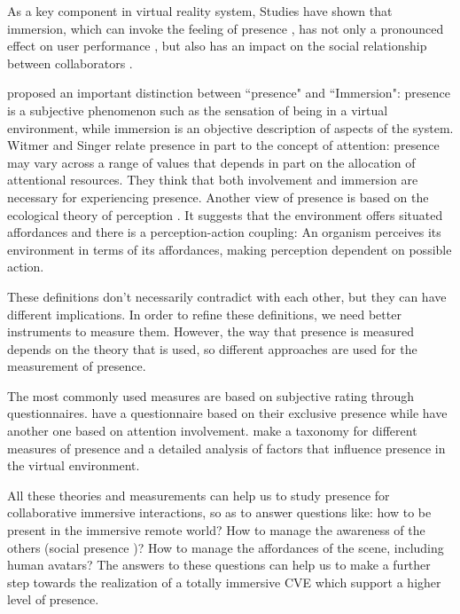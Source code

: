As a key component in virtual reality system, 
Studies have shown that immersion, which can invoke the feeling of presence \citep{Slater1994DepthPre}, has not only a pronounced effect on user performance \citep{Dangelo2008Benefits}, but also has an impact on the social relationship between collaborators \citep{Slater2000Small}.

\citet{Slater1994DepthPre} proposed an important distinction between ``presence" and ``Immersion": presence is a subjective phenomenon such as the sensation of being in a virtual environment, while immersion is an objective description of aspects of the system.
Witmer and Singer relate presence in part to the concept of attention: presence may vary across a range of values that depends in part on the allocation of attentional resources.
They think that both involvement and immersion are necessary for experiencing presence.
Another view of presence is based on the ecological theory of perception \citep{Gibson2014Ecological}.
It suggests that the environment offers situated affordances and there is a perception-action coupling: An organism perceives its environment in terms of its affordances, making perception dependent on possible action.

These definitions don't necessarily contradict with each other, but they can have different implications.
In order to refine these definitions, we need better instruments to measure them.
However, the way that presence is measured depends on the theory that is used, so different approaches are used for the measurement of presence.

The most commonly used measures are based on subjective rating through questionnaires.
\citet{Usoh2000Using} have a questionnaire based on their exclusive presence while \citet{Witmer1998MPV} have another one based on attention involvement. \citet{Schuemie2001Pres} make a taxonomy for different measures of presence and a detailed analysis of factors that influence presence in the virtual environment.

All these theories and measurements can help us to study presence for collaborative immersive interactions, so as to answer questions like: how to be present in the immersive remote world? How to manage the awareness of the others (social presence \citep{Mantovani1999Real})? How to manage the affordances of the scene, including human avatars?
The answers to these questions can help us to make a further step towards the realization of a totally immersive CVE which support a higher level of presence.

